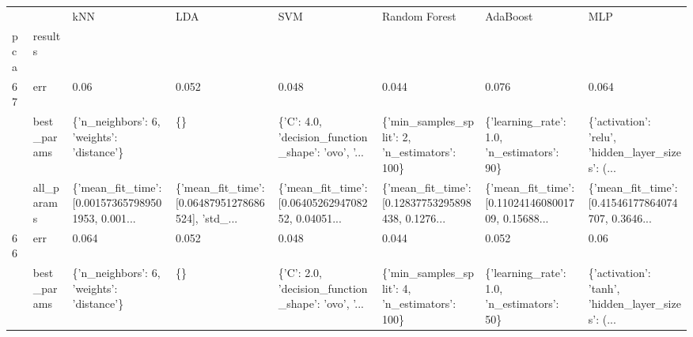 \begin{tabular}{llllllll}
\toprule
   &            &                                                kNN &                                                LDA &                                                SVM &                                      Random Forest &                                           AdaBoost &                                                MLP \\
pca & results &                                                    &                                                    &                                                    &                                                    &                                                    &                                                    \\
\midrule
67 & err &                                               0.06 &                                              0.052 &                                              0.048 &                                              0.044 &                                              0.076 &                                              0.064 \\
   & best\_params &          \{'n\_neighbors': 6, 'weights': 'distance'\} &                                                 \{\} &  \{'C': 4.0, 'decision\_function\_shape': 'ovo', '... &      \{'min\_samples\_split': 2, 'n\_estimators': 100\} &         \{'learning\_rate': 1.0, 'n\_estimators': 90\} &  \{'activation': 'relu', 'hidden\_layer\_sizes': (... \\
   & all\_params &  \{'mean\_fit\_time': [0.001573657989501953, 0.001... &  \{'mean\_fit\_time': [0.06487951278686524], 'std\_... &  \{'mean\_fit\_time': [0.0640526294708252, 0.04051... &  \{'mean\_fit\_time': [0.12837753295898438, 0.1276... &  \{'mean\_fit\_time': [0.1102414608001709, 0.15688... &  \{'mean\_fit\_time': [0.41546177864074707, 0.3646... \\
66 & err &                                              0.064 &                                              0.052 &                                              0.048 &                                              0.044 &                                              0.052 &                                               0.06 \\
   & best\_params &          \{'n\_neighbors': 6, 'weights': 'distance'\} &                                                 \{\} &  \{'C': 2.0, 'decision\_function\_shape': 'ovo', '... &      \{'min\_samples\_split': 4, 'n\_estimators': 100\} &         \{'learning\_rate': 1.0, 'n\_estimators': 50\} &  \{'activation': 'tanh', 'hidden\_layer\_sizes': (... \\

\end{tabular}

